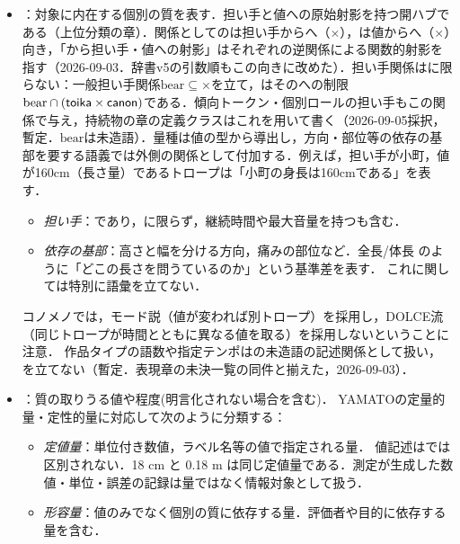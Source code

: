 \documentclass[../../main-detail.tex]{subfiles}
\begin{document}
\begin{itemize}
    \item \emph{}：対象に内在する個別の質を表す．担い手と値への原始射影を持つ開ハブである（上位分類の章）．関係としてのは担い手からへ（$\times$），は値からへ（$\times$）向き，「から担い手・値への射影」はそれぞれの逆関係による関数的射影を指す（2026-09-03．辞書v5の引数順もこの向きに改めた）．担い手関係はに限らない：一般担い手関係$\mathrm{bear}\subseteq$$\times$を立て，はそのへの制限$\mathrm{bear}\cap(\textsf{toika}\times\textsf{canon})$である．傾向トークン・個別ロールの担い手もこの関係で与え，持続物の章の定義クラスはこれを用いて書く（2026-09-05採択，暫定．$\mathrm{bear}$は未造語）．量種は値の型から導出し，方向・部位等の依存の基部を要する語義では外側の関係として付加する．例えば，担い手が小町，値が160cm（長さ量）であるトロープは「小町の身長は160cmである」を表す．
    \begin{itemize}
        \item \emph{担い手}：であり，に限らず，継続時間や最大音量を持つも含む．
        \item \emph{依存の基部}：高さと幅を分ける方向，痛みの部位など．全長/体長 のように「どこの長さを問うているのか」という基準差を表す．
        これに関しては特別に語彙を立てない．
    \end{itemize}
    コノメノでは，モード説（値が変われば別トロープ）を採用し，DOLCE流（同じトロープが時間とともに異なる値を取る）を採用しないということに注意．
    作品タイプの語数や指定テンポはの未造語の記述関係として扱い，を立てない（暫定．表現章の未決一覧の同件と揃えた，2026-09-03）．
    \item \emph{}：質の取りうる値や程度(明言化されない場合を含む)．
    YAMATOの定量的量・定性的量に対応して次のように分類する：
    \begin{itemize}
        \item \emph{定値量}：単位付き数値，ラベル名等の値で指定される量．
        値記述はでは区別されない．18 cm と 0.18 m は同じ定値量である．測定が生成した数値・単位・誤差の記録は量ではなく情報対象として扱う．
        \item \emph{形容量}：値のみでなく個別の質に依存する量．評価者や目的に依存する量を含む．
    \end{itemize}
\end{itemize}
\end{document}
